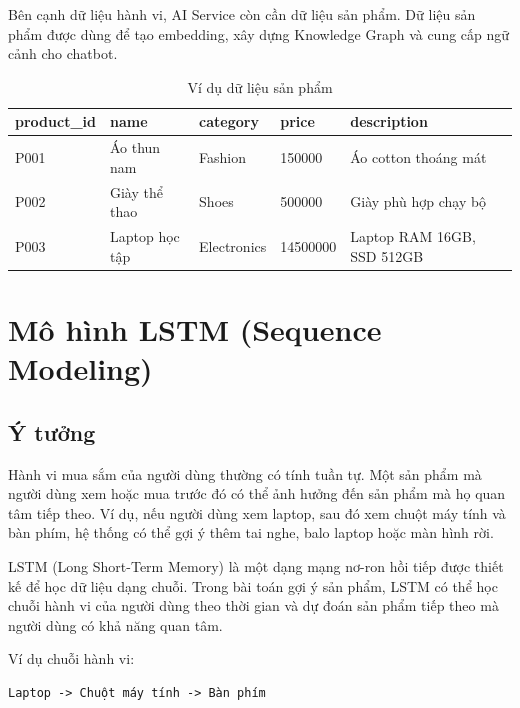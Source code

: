 \documentclass[../main.tex]{subfiles}
\begin{document}
Bên cạnh dữ liệu hành vi, AI Service còn cần dữ liệu sản phẩm. Dữ liệu sản phẩm được dùng để tạo embedding, xây dựng Knowledge Graph và cung cấp ngữ cảnh cho chatbot.

\begin{table}[H]
    \centering
    \caption{Ví dụ dữ liệu sản phẩm}
    \label{tab:chapter3-product-data-example}
    \begin{tabular}{|p{}|p{}|p{}|p{}|p{}|}
        \hline
        \rowcolor{primary!35}
        \textbf{product\_id} & \textbf{name} & \textbf{category} & \textbf{price} & \textbf{description} \\
\hline
P001 & Áo thun nam & Fashion & 150000 & Áo cotton thoáng mát \\
\hline
P002 & Giày thể thao & Shoes & 500000 & Giày phù hợp chạy bộ \\
\hline
P003 & Laptop học tập & Electronics & 14500000 & Laptop RAM 16GB, SSD 512GB \\
\hline
\end{tabular}
\end{table}

\section{Mô hình LSTM (Sequence Modeling)}

\subsection{Ý tưởng}

Hành vi mua sắm của người dùng thường có tính tuần tự. Một sản phẩm mà người dùng xem hoặc mua trước đó có thể ảnh hưởng đến sản phẩm mà họ quan tâm tiếp theo. Ví dụ, nếu người dùng xem laptop, sau đó xem chuột máy tính và bàn phím, hệ thống có thể gợi ý thêm tai nghe, balo laptop hoặc màn hình rời.

LSTM (Long Short-Term Memory) là một dạng mạng nơ-ron hồi tiếp được thiết kế để học dữ liệu dạng chuỗi. Trong bài toán gợi ý sản phẩm, LSTM có thể học chuỗi hành vi của người dùng theo thời gian và dự đoán sản phẩm tiếp theo mà người dùng có khả năng quan tâm.

Ví dụ chuỗi hành vi:

\begin{verbatim}
Laptop -> Chuột máy tính -> Bàn phím
\end{verbatim}
\end{document}

